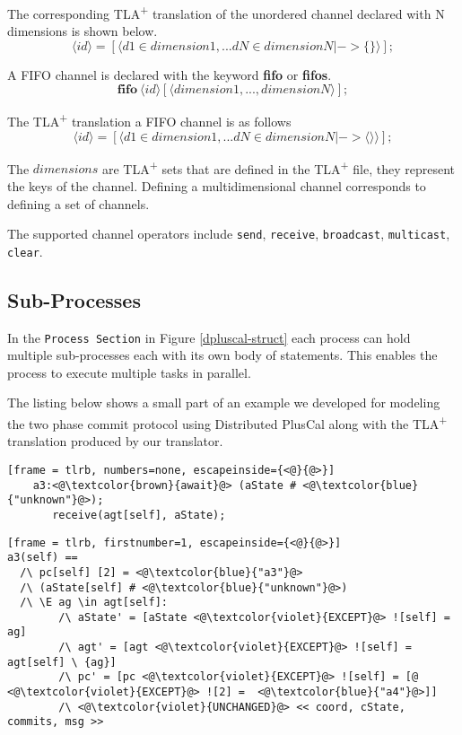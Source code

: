 \documentclass[journal]{IEEEtran}
\newcommand{\tlaplus}{TLA\textsuperscript{+}\xspace}
\newcommand{\seq}[1]{\langle #1 \rangle}
\newcommand{\keyword}[1]{\textbf{#1}}
\newcommand{\entity}[1]{\ensuremath{\langle}#1\ensuremath{\rangle}}
\begin{document}
The corresponding \tlaplus translation of the unordered channel declared with N dimensions is shown below.
\[
 \entity{id} = [\entity{d1 \in dimension1,... dN \in dimensionN |-> \{ \}}];
\]

A FIFO channel is declared with the keyword \keyword{fifo} or \keyword{fifos}.  
\[
 \keyword{fifo}\ \entity{id}[\entity{dimension1,...,dimensionN}];
\]

The \tlaplus translation a FIFO channel is as follows
\[
 \entity{id} = [\entity{d1 \in dimension1,... dN \in dimensionN |-> \seq{}}];
\]

The $dimensions$ are \tlaplus sets that are defined in the \tlaplus file, they represent the keys of the channel. Defining a multidimensional channel corresponds to defining a set of channels.

The supported channel operators include \verb|send|, \verb|receive|, \verb|broadcast|, \verb|multicast|, \verb|clear|.

\subsection{Sub-Processes}
In the \verb|Process Section| in Figure \ref{dpluscal-struct} each process can hold multiple sub-processes each with its own body of statements. This enables the process to execute multiple tasks in parallel.

The listing below shows a small part of an example we developed for modeling the two phase commit protocol using Distributed PlusCal along with the \tlaplus translation produced by our translator.

 \begin{lstlisting}[frame = tlrb, numbers=none, escapeinside={<@}{@>}]  
    a3:<@\textcolor{brown}{await}@> (aState # <@\textcolor{blue}{"unknown"}@>);
       receive(agt[self], aState); 
\end{lstlisting}

\begin{lstlisting}[frame = tlrb, firstnumber=1, escapeinside={<@}{@>}]  
a3(self) == 
  /\ pc[self] [2] = <@\textcolor{blue}{"a3"}@>
  /\ (aState[self] # <@\textcolor{blue}{"unknown"}@>)
  /\ \E ag \in agt[self]:
        /\ aState' = [aState <@\textcolor{violet}{EXCEPT}@> ![self] = ag]
        /\ agt' = [agt <@\textcolor{violet}{EXCEPT}@> ![self] = agt[self] \ {ag}]
        /\ pc' = [pc <@\textcolor{violet}{EXCEPT}@> ![self] = [@  <@\textcolor{violet}{EXCEPT}@> ![2] =  <@\textcolor{blue}{"a4"}@>]]
        /\ <@\textcolor{violet}{UNCHANGED}@> << coord, cState, commits, msg >>
\end{lstlisting}
\end{document}
